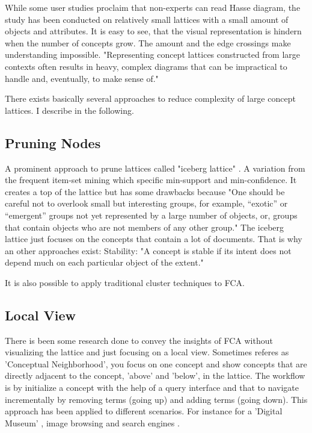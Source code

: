 \documentclass[11pt]{article}
\begin{document}
While some user studies proclaim that non-experts can read Hasse diagram\cite{Eklund2004}, the study has been conducted on relatively small lattices with a small amount of objects and attributes. It is easy to see, that the visual representation is hindern when the number of concepts grow. The amount and the edge crossings make understanding impossible. "Representing concept lattices constructed from large contexts often results in heavy, complex diagrams that can be impractical to handle and, eventually, to make sense of." \cite{Kuznetsov20072}

There exists basically several approaches to reduce complexity of large concept lattices. I describe in the following.
\subsection{Pruning Nodes}

A prominent approach to prune lattices called "iceberg lattice" \cite{Stumme2002}. A variation from the frequent item-set mining which specific min-support and min-confidence\cite{Agrawal1993}. It creates a top of the lattice but has some drawbacks because "One should be careful not to overlook small but interesting groups, for example, “exotic” or “emergent” groups not yet represented by a large number of objects, or, groups that contain objects who are not members of any other group."\cite{Kuznetsov20072} The iceberg lattice just focuses on the concepts that contain a lot of documents. That is why an other approaches exist: Stability\cite{Kuznetsov2007}: "A concept is stable if its intent does not depend much on each particular object of the extent." \cite{Kuznetsov20072}

	It is also possible to apply traditional cluster techniques to FCA.\cite{AswaniKumar2010}

\subsection{Local View}

There is been some research done to convey the insights of FCA without visualizing the lattice and just focusing on a local view. Sometimes referes as 'Conceptual Neighborhood'\cite{Eklund2009,Eklund2012}, you focus on one concept and show concepts that are directly adjacent to the concept, 'above' and 'below', in the lattice. The workflow is by initialize a concept with the help of a query interface and that to navigate incrementally by removing terms (going up) and adding terms (going  down). This approach has been applied to different scenarios. For instance for a 'Digital Museum' \cite{Eklund2009,Eklund2012}, image browsing \cite{Ducrou2006,Ducrou2008} and search engines \cite{Dau2008,Kim2006}.
\end{document}
